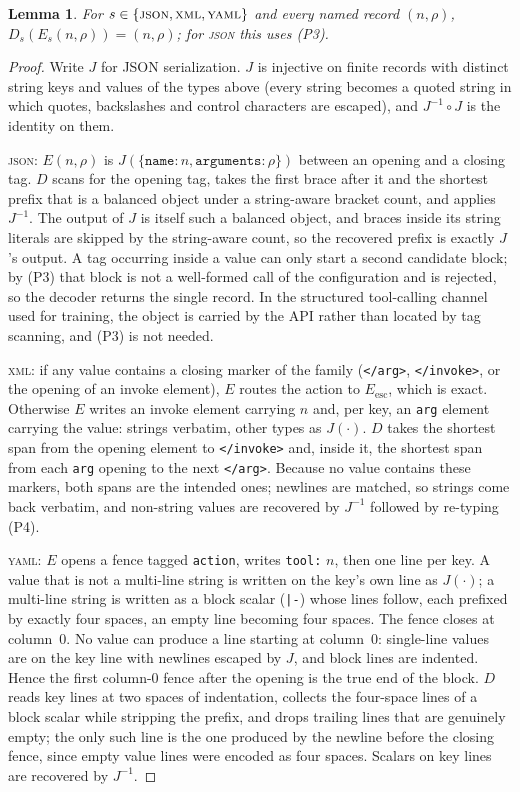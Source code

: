 \documentclass{article} %
\newtheorem{lemma}{Lemma}
\begin{document}
\begin{lemma}\label{lem:named}
For $s\in\{\textup{\textsc{json}},\textup{\textsc{xml}},\textup{\textsc{yaml}}\}$
and every named record $(n,\rho)$, $D_s(E_s(n,\rho))=(n,\rho)$; for
\textup{\textsc{json}} this uses (P3).
\end{lemma}
\begin{proof}
Write $J$ for JSON serialization. $J$ is injective on finite
records with distinct string keys and values of the types above (every string
becomes a quoted string in which quotes, backslashes and control characters
are escaped), and $J^{-1}\circ J$ is the identity on them.

\textsc{json}: $E(n,\rho)$ is $J(\{\texttt{name}:n,\texttt{arguments}:\rho\})$
between an opening and a closing tag. $D$ scans for the opening tag, takes the
first brace after it and the shortest prefix that is a balanced object under a
string-aware bracket count, and applies $J^{-1}$. The output of $J$ is itself
such a balanced object, and braces inside its string literals are skipped by
the string-aware count, so the recovered prefix is exactly $J$'s output. A tag
occurring inside a value can only start a second candidate block; by (P3) that
block is not a well-formed call of the configuration and is rejected, so the
decoder returns the single record. In the structured tool-calling channel used
for training, the object is carried by the API rather than located by tag
scanning, and (P3) is not needed.

\textsc{xml}: if any value contains a closing marker of the family
(\texttt{</arg>}, \texttt{</invoke>}, or the opening of an invoke element),
$E$ routes the action to $E_{\mathrm{esc}}$, which is exact. Otherwise $E$
writes an invoke element carrying $n$ and, per key, an \texttt{arg} element
carrying the value: strings verbatim, other types as $J(\cdot)$. $D$ takes the
shortest span from the opening element to \texttt{</invoke>} and, inside it,
the shortest span from each \texttt{arg} opening to the next \texttt{</arg>}.
Because no value contains these markers, both spans are the intended ones;
newlines are matched, so strings come back verbatim, and non-string values are
recovered by $J^{-1}$ followed by re-typing (P4).

\textsc{yaml}: $E$ opens a fence tagged \texttt{action}, writes
\texttt{tool:} $n$, then one line per key. A value that is not a multi-line
string is written on the key's own line as $J(\cdot)$; a multi-line string is
written as a block scalar (\texttt{|-}) whose lines follow, each prefixed by
exactly four spaces, an empty line becoming four spaces. The fence closes at
column~0. No value can produce a line starting at column~0: single-line values
are on the key line with newlines escaped by $J$, and block lines are indented.
Hence the first column-0 fence after the opening is the true end of the block.
$D$ reads key lines at two spaces of indentation, collects the four-space lines
of a block scalar while stripping the prefix, and drops trailing lines that are
genuinely empty; the only such line is the one produced by the newline before
the closing fence, since empty value lines were encoded as four spaces. Scalars
on key lines are recovered by $J^{-1}$.
\end{proof}
\end{document}
